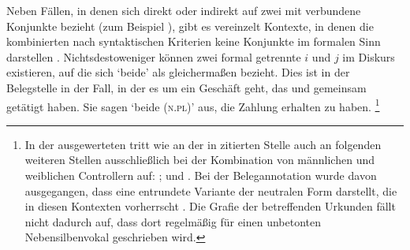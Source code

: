 Neben Fällen, in denen sich  direkt oder indirekt auf zwei mit
 verbundene Konjunkte bezieht (zum Beispiel ), gibt es vereinzelt Kontexte, in
denen die kombinierten  nach syntaktischen Kriterien keine
Konjunkte im formalen Sinn darstellen
\autocite[vgl.~auch][247--248]{askedal1973}. Nichtsdestoweniger können zwei
formal getrennte  $i$ und $j$ im Diskurs existieren, auf die
sich  `beide' als  gleichermaßen bezieht. Dies ist in
der Belegstelle in  der Fall, in der es um ein Geschäft
geht, das  und  gemeinsam getätigt haben. Sie sagen
 `beide (\textsc{n.pl})' aus, die Zahlung erhalten zu haben.%
%
	\footnote{In der ausgewerteten  tritt  wie an
		der in  zitierten Stelle auch an folgenden
		weiteren Stellen ausschließlich bei der Kombination von männlichen und
		weiblichen Controllern auf:
		\citet[124,23; Nr.~81, Kl.~Tennenbach, Kr.~Emmendingen, 1264]{cao1};
		\citet[205,38--39; Nr.~190, Basel, 1273]{cao1} und
		\citet[175,14; Nr.~N~230, Straßburg, 1283]{cao5}.
		Bei der Belegannotation wurde davon ausgegangen, dass
		 eine entrundete Variante der neutralen Form 
		darstellt, die in diesen Kontexten vorherrscht \autocites(siehe auch
		Anhang~\ref{sec:caoalemschwa})[vgl.][41]{paul2007}. Die Grafie der
		betreffenden Urkunden fällt nicht dadurch auf, dass dort
		regelmäßig  für einen unbetonten Nebensilbenvokal geschrieben
		wird.\label{fn:caoalemschwa}}


